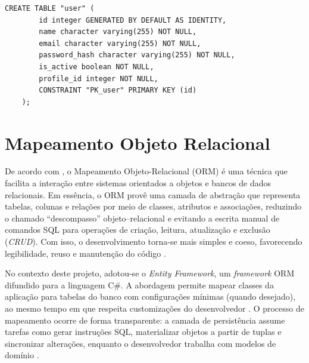\begin{quadro}[H]
	\caption[Script SQL --- Tabela \texttt{user}]{Script SQL --- Tabela \texttt{user}}
	\label{quadro:script-user}
	
	\begin{minipage}{0.96\textwidth}
		\begin{lstlisting}[style=academic-sql]
	CREATE TABLE "user" (
		id integer GENERATED BY DEFAULT AS IDENTITY,
		name character varying(255) NOT NULL,
		email character varying(255) NOT NULL,
		password_hash character varying(255) NOT NULL,
		is_active boolean NOT NULL,
		profile_id integer NOT NULL,
		CONSTRAINT "PK_user" PRIMARY KEY (id)
	);
		\end{lstlisting}
	\end{minipage}
	
\end{quadro}

\section{Mapeamento Objeto Relacional}

De acordo com \textcite{Silberschatz2012}, o Mapeamento Objeto-Relacional (ORM) é uma técnica que facilita a interação entre sistemas orientados a objetos e bancos de dados relacionais. Em essência, o ORM provê uma camada de abstração que representa tabelas, colunas e relações por meio de classes, atributos e associações, reduzindo o chamado ``descompasso'' objeto--relacional e evitando a escrita manual de comandos SQL para operações de criação, leitura, atualização e exclusão (\emph{CRUD}). Com isso, o desenvolvimento torna-se mais simples e coeso, favorecendo legibilidade,
reuso e manutenção do código \parencite{Silberschatz2012}.

No contexto deste projeto, adotou-se o \emph{Entity Framework}, um \emph{framework} ORM difundido para a linguagem C\#. A abordagem permite mapear classes da aplicação para tabelas do banco com configurações mínimas (quando desejado), ao mesmo tempo em que respeita customizações do desenvolvedor \parencite{Silberschatz2012}. O processo de
mapeamento ocorre de forma transparente: a camada de persistência assume tarefas como gerar instruções SQL, materializar objetos a partir de tuplas e sincronizar alterações, enquanto o desenvolvedor trabalha com modelos de domínio \parencite{Silberschatz2012}.

